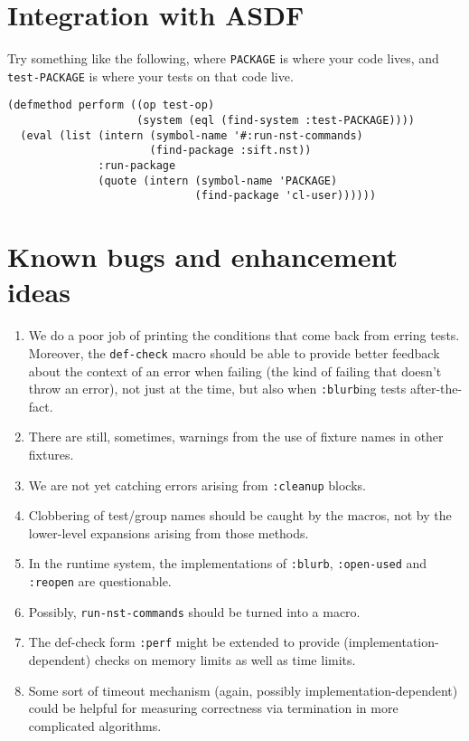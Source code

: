 \documentclass{article}
\begin{document}
%

\section{Integration with ASDF}
Try something like the following, where \texttt{PACKAGE} is where
your code lives, and \texttt{test-PACKAGE} is where your tests on that
code live.
\begin{verbatim}
(defmethod perform ((op test-op)
                    (system (eql (find-system :test-PACKAGE))))
  (eval (list (intern (symbol-name '#:run-nst-commands)
                      (find-package :sift.nst))
              :run-package
              (quote (intern (symbol-name 'PACKAGE)
                             (find-package 'cl-user))))))
\end{verbatim}

\section{Known bugs and enhancement ideas}
\begin{enumerate}
\item We do a poor job of printing the conditions that come back from
  erring tests.  Moreover, the
  \texttt{def-check} macro should
  be able to provide better feedback about the context of an error
  when failing (the kind of failing that doesn't throw an error), not
  just at the time, but also when
  \texttt{:blurb}ing tests
  after-the-fact.
\item There are still, sometimes, warnings from the use of fixture
  names in other fixtures.
\item We are not yet catching errors arising from
  \texttt{:cleanup} blocks.
\item Clobbering of test/group names should be caught by the macros,
  not by the lower-level expansions arising from those methods.
\item In the runtime system, the implementations of
  \texttt{:blurb},
  \texttt{:open-used} and
  \texttt{:reopen} are questionable.
\item Possibly,
  \texttt{run-nst-commands}
  should be turned into a macro.
\item The def-check form \texttt{:perf} might be extended to provide
  (implementation-dependent) checks on memory limits as well as time
  limits.
\item Some sort of timeout mechanism (again, possibly
  implementation-dependent) could be helpful for measuring correctness
  via termination in more complicated algorithms.
\end{enumerate}
\end{document}
